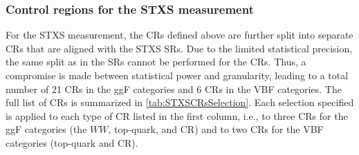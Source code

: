 \subsubsection{Control regions for the STXS measurement}
\label{subsubsec:stxs-crs}
For the STXS measurement, the CRs defined above are further split into separate CRs that are aligned with the STXS SRs. Due to the limited statistical precision, the same split as in the SRs cannot be performed for the CRs. Thus, a compromise is made between statistical power and granularity, leading to a total number of 21 CRs in the ggF categories and 6 CRs in the VBF categories.
The full list of CRs is summarized in \cref{tab:STXSCRsSelection}.
Each selection specified is applied to each type of CR listed in the first column, i.e., to three CRs for the ggF categories (the $WW$, top-quark, and \Ztautau CR) and to two CRs for the VBF categories (top-quark and \Ztautau CR).
\begin{table}[ht]
    \caption{
        Event selection criteria used to define the control regions used in the STXS measurement.
        The selections start from the nominal CR selections summarized in \cref{tab:CRsSelection}.
    }
    \label{tab:STXSCRsSelection}
    \centering
    \resizebox{\textwidth}{!}{
        
    }
\end{table}


